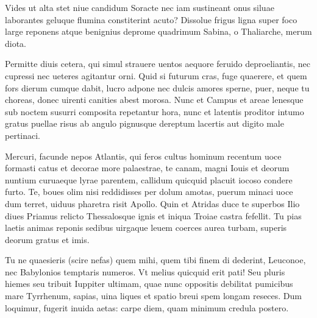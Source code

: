 \documentclass{book}
\newenvironment {carmen} [1] [\relax] 
  {\Titulus \Versus \incipit*\numerus{1}#1}
  {\endVersus}
\newcommand {\Sapphic}   {\Forma \strophae {0 \poena 00 \poena 1}}
\newcommand {\Alcaic}    {\Forma \strophae {0 \poena 01 \poena 2}}
\begin{document}
\begin{carmen}[\Alcaic]


 Vides ut alta stet niue candidum
 Soracte nec iam sustineant onus
      siluae laborantes geluque
      flumina constiterint acuto?
 Dissolue frigus ligna super foco               
 large reponens atque benignius
      deprome quadrimum Sabina,
      o Thaliarche, merum diota.

 Permitte diuis cetera, qui simul
 strauere uentos aequore feruido               
      deproeliantis, nec cupressi
      nec ueteres agitantur orni.
 Quid si futurum cras, fuge quaerere, et
 quem fors dierum cumque dabit, lucro
       adpone nec dulcis amores
      sperne, puer, neque tu choreas,               
 donec uirenti canities abest
 morosa. Nunc et Campus et areae
      lenesque sub noctem susurri
       composita repetantur hora,
 nunc et latentis proditor intumo               
 gratus puellae risus ab angulo
      pignusque dereptum lacertis
      aut digito male pertinaci. 

\end{carmen}

\begin{carmen}[\Sapphic]


 Mercuri, facunde nepos Atlantis,
 qui feros cultus hominum recentum
 uoce formasti catus et decorae
      more palaestrae,
 te canam, magni Iouis et deorum               
 nuntium curuaeque lyrae parentem,
 callidum quicquid placuit iocoso
      condere furto.
 Te, boues olim nisi reddidisses
 per dolum amotas, puerum minaci               
 uoce dum terret, uiduus pharetra
      risit Apollo.
 Quin et Atridas duce te superbos
 Ilio diues Priamus relicto
 Thessalosque ignis et iniqua Troiae               
      castra fefellit.
 Tu pias laetis animas reponis
 sedibus uirgaque leuem coerces
 aurea turbam, superis deorum
       gratus et imis.                

\end{carmen}

\begin{carmen}


 Tu ne quaesieris (scire nefas) quem mihi, quem tibi
 finem di dederint, Leuconoe, nec Babylonios
 temptaris numeros. Vt melius quicquid erit pati!
 Seu pluris hiemes seu tribuit Iuppiter ultimam,
 quae nunc oppositis debilitat pumicibus mare               
 Tyrrhenum, sapias, uina liques et spatio breui
 spem longam reseces. Dum loquimur, fugerit inuida
 aetas: carpe diem, quam minimum credula postero. 

\end{carmen}
\end{document}
